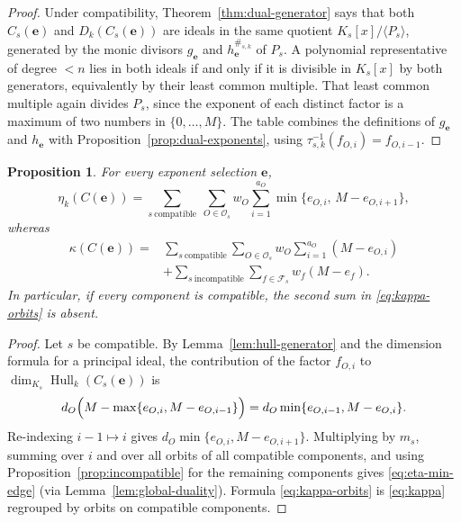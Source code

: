 \documentclass[preprint,12pt,a4paper]{elsarticle}
\newcommand{\Fs}{\mathcal F_s}
\newcommand{\Os}{\mathcal O_s}
\newcommand{\Hull}{\operatorname{Hull}}
\newcommand{\Dk}{D_k}
\newtheorem{proposition}[theorem]{Proposition}
\theoremstyle{definition}
\theoremstyle{remark}
\begin{document}
\begin{proof}
Under compatibility, Theorem~\ref{thm:dual-generator} says that both
$C_s(\mathbf{e})$ and $\Dk(C_s(\mathbf{e}))$ are ideals in the same quotient
$K_s[x]/\langle P_s\rangle$, generated by the monic divisors
$g_{\mathbf{e}}$ and $h_{\mathbf{e}}^{\#_{s,k}}$ of $P_s$.  A polynomial
representative of degree $<n$ lies in both ideals if and only if it is
divisible in $K_s[x]$ by both generators, equivalently by their least common
multiple.  That least common multiple again divides $P_s$, since the exponent
of each distinct factor is a maximum of two numbers in $\{0,\ldots,M\}$.  The
table combines the definitions of $g_{\mathbf{e}}$ and $h_{\mathbf{e}}$ with
Proposition~\ref{prop:dual-exponents}, using
$\tau_{s,k}^{-1}(f_{O,i})=f_{O,i-1}$.
\end{proof}

\begin{proposition}\label{prop:min-edge}
For every exponent selection $\mathbf{e}$,
{\small
\begin{equation}\label{eq:eta-min-edge}
\eta_k(C(\mathbf{e}))
 =\sum_{s\ \mathrm{compatible}}\ \sum_{O\in\Os}
   w_O\sum_{i=1}^{a_O}\min\{e_{O,i},\,M-e_{O,i+1}\},
\end{equation}
}
whereas
\begin{equation}\label{eq:kappa-orbits}
\begin{split}
\kappa(C(\mathbf{e}))
={}&\sum_{s\ \mathrm{compatible}}\sum_{O\in\Os}
w_O\sum_{i=1}^{a_O}(M-e_{O,i})\\
&+\sum_{s\ \mathrm{incompatible}}\sum_{f\in\Fs}
w_f(M-e_f).
\end{split}
\end{equation}
In particular, if every component is compatible, the second sum in
\eqref{eq:kappa-orbits} is absent.
\end{proposition}

\begin{proof}
Let $s$ be compatible.  By Lemma~\ref{lem:hull-generator} and the dimension
formula for a principal ideal, the contribution of the factor $f_{O,i}$ to
$\dim_{K_s}\Hull_k(C_s(\mathbf{e}))$ is
{\small
\[
d_O\Bigl(M-\max\{e_{O,i},M-e_{O,i-1}\}\Bigr)
   =d_O\min\{e_{O,i-1},M-e_{O,i}\}.
\]
}
Re-indexing $i-1\mapsto i$ gives $d_O\min\{e_{O,i},M-e_{O,i+1}\}$.
Multiplying by $m_s$, summing over $i$ and over all orbits of all compatible
components, and using Proposition~\ref{prop:incompatible} for the remaining
components gives \eqref{eq:eta-min-edge} (via
Lemma~\ref{lem:global-duality}).  Formula \eqref{eq:kappa-orbits} is
\eqref{eq:kappa} regrouped by orbits on compatible components.
\end{proof}
\end{document}
